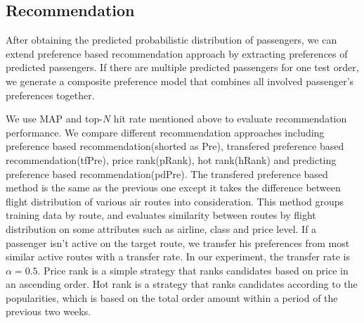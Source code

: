 \documentclass{llncs}
\begin{document}
\subsection{Recommendation}
After obtaining the predicted probabilistic distribution of passengers, we can extend preference based recommendation approach by  extracting preferences of predicted passengers. If there are multiple predicted passengers for one test order, we generate a composite preference model that combines all involved passenger's preferences together. \par
We use MAP and top-$N$ hit rate mentioned above to evaluate recommendation performance. We compare different recommendation approaches including preference based recommendation(shorted as Pre), transfered preference based recommendation(tfPre), price rank(pRank), hot rank(hRank) and predicting preference based recommendation(pdPre). The transfered preference based method is the same as the previous one except it takes the difference between flight distribution of various air routes into consideration. This method groups training data by route, and evaluates similarity between routes by flight distribution on some attributes such as airline, class and price level. If a passenger isn't active on the target route, we transfer his preferences from most similar active routes with a transfer rate. In our experiment, the transfer rate is  $ \alpha = 0.5$. Price rank is a simple strategy that ranks candidates based on price in an ascending order. Hot rank is a strategy that ranks candidates according to the popularities, which is based on the total order amount within a period of the previous two weeks. \par
\end{document}
